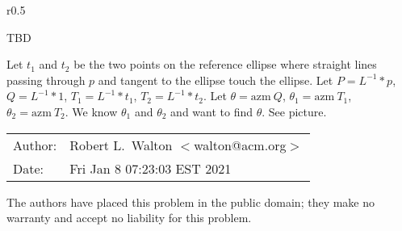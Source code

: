 \documentclass[12pt]{article}
\begin{document}
\begin{minipage}{\textwidth}\raggedright
\label{INTERSECTION-PICTURE}
\begin{wrapfigure}{r}{0.5\textwidth}
\end{wrapfigure}
TBD

Let $t_1$ and $t_2$ be the two points on the
reference ellipse where straight lines passing through $p$ and tangent
to the ellipse touch the ellipse.  Let $P=L^{-1}*p$, $Q=L^{-1}*1$,
$T_1=L^{-1}*t_1$, $T_2=L^{-1}*t_2$.
Let $\theta=\mathrm{azm}~Q$,
$\theta_1=\mathrm{azm}~T_1$,
$\theta_2=\mathrm{azm}~T_2$.
We know $\theta_1$ and $\theta_2$ and want to find $\theta$.
See picture.
\end{minipage}



\bigskip

\begin{tabular}{ll}
Author:	      & Robert L.~Walton $<$walton@acm.org$>$ \\
Date:         & Fri Jan  8 07:23:03 EST 2021

\end{tabular}

The authors have placed this problem in the public domain;
they make no warranty and accept no liability for this problem.
\end{document}
